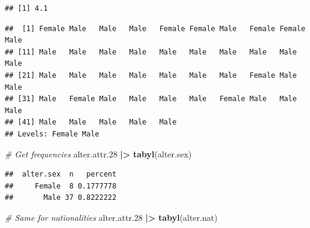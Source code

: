 \documentclass[
]{book}
\newenvironment{Shaded}{\begin{snugshade}}{\end{snugshade}}
\newcommand{\AttributeTok}[1]{\textcolor[rgb]{0.13,0.29,0.53}{#1}}
\newcommand{\CommentTok}[1]{\textcolor[rgb]{0.56,0.35,0.01}{\textit{#1}}}
\newcommand{\ConstantTok}[1]{\textcolor[rgb]{0.56,0.35,0.01}{#1}}
\newcommand{\FloatTok}[1]{\textcolor[rgb]{0.00,0.00,0.81}{#1}}
\newcommand{\FunctionTok}[1]{\textcolor[rgb]{0.13,0.29,0.53}{\textbf{#1}}}
\newcommand{\NormalTok}[1]{#1}
\newcommand{\SpecialCharTok}[1]{\textcolor[rgb]{0.81,0.36,0.00}{\textbf{#1}}}
\begin{document}
\begin{Shaded}
\end{Shaded}

\begin{verbatim}
## [1] 4.1
\end{verbatim}

\begin{Shaded}
\end{Shaded}

\begin{verbatim}
##  [1] Female Male   Male   Male   Female Female Male   Female Female Male  
## [11] Male   Male   Male   Male   Male   Male   Male   Male   Male   Male  
## [21] Male   Male   Male   Male   Male   Male   Male   Female Male   Male  
## [31] Male   Female Male   Male   Male   Male   Female Male   Male   Male  
## [41] Male   Male   Male   Male   Male  
## Levels: Female Male
\end{verbatim}

\begin{Shaded}
\begin{Highlighting}[]
\CommentTok{\# Get frequencies}
\NormalTok{alter.attr}\FloatTok{.28} \SpecialCharTok{|\textgreater{}}
  \FunctionTok{tabyl}\NormalTok{(alter.sex)}
\end{Highlighting}
\end{Shaded}

\begin{verbatim}
##  alter.sex  n   percent
##     Female  8 0.1777778
##       Male 37 0.8222222
\end{verbatim}

\begin{Shaded}
\begin{Highlighting}[]
\CommentTok{\# Same for nationalities}
\NormalTok{alter.attr}\FloatTok{.28} \SpecialCharTok{|\textgreater{}}
  \FunctionTok{tabyl}\NormalTok{(alter.nat)}
\end{Highlighting}
\end{Shaded}
\end{document}
